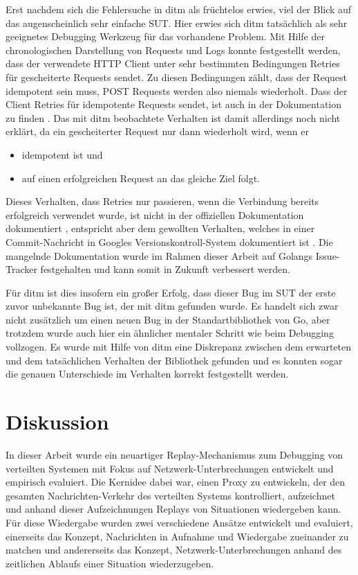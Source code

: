 \documentclass[12pt,a4paper]{report}
\begin{document}
Erst nachdem sich die Fehlersuche in ditm als früchtelos erwies, viel der Blick auf das augenscheinlich sehr einfache SUT.  Hier
erwies sich ditm tatsächlich als sehr geeignetes Debugging Werkzeug für das vorhandene Problem. Mit Hilfe der chronologischen
Darstellung von Requests und Logs konnte festgestellt werden, dass der verwendete HTTP Client unter sehr bestimmten Bedingungen
Retries für gescheiterte Requests sendet. Zu diesen Bedingungen zählt, dass der Request idempotent sein muss, POST Requests werden
also niemals wiederholt. Dass der Client Retries für idempotente Requests sendet, ist auch in der Dokumentation zu finden
\cite{go_transport_docs}. Das mit ditm beobachtete Verhalten ist damit allerdings noch nicht erklärt, da ein gescheiterter Request
nur dann wiederholt wird, wenn er
\begin{itemize}
    \item idempotent ist und
    \item auf einen erfolgreichen Request an das gleiche Ziel folgt.
\end{itemize}
Dieses Verhalten, dass Retries nur passieren, wenn die Verbindung bereits erfolgreich verwendet wurde,
ist nicht in der offiziellen Dokumentation dokumentiert \cite{go_transport_docs}, entspricht aber dem gewollten Verhalten, welches in
einer Commit-Nachricht in Googles Versionskontroll-System dokumentiert ist \cite{go_retry_commit}. Die mangelnde Dokumentation
wurde im Rahmen dieser Arbeit auf Golangs Issue-Tracker festgehalten und kann somit in Zukunft verbessert werden.

Für ditm ist dies insofern ein großer Erfolg, dass dieser Bug im SUT der erste zuvor unbekannte Bug ist, der mit ditm gefunden
wurde. Es handelt sich zwar nicht zusätzlich um einen neuen Bug in der Standartbibliothek von Go, aber trotzdem wurde auch hier
ein ähnlicher mentaler Schritt wie beim Debugging vollzogen. Es wurde mit Hilfe von ditm eine Diskrepanz zwischen dem erwarteten
und dem tatsächlichen Verhalten der Bibliothek gefunden und es konnten sogar die genauen Unterschiede im Verhalten korrekt
festgestellt werden.

\chapter{Diskussion}
\label{chap:discussion}
In dieser Arbeit wurde ein neuartiger Replay-Mechanismus zum Debugging von verteilten Systemen mit Fokus auf
Netzwerk-Unterbrechungen entwickelt und empirisch evaluiert. Die Kernidee dabei war, einen Proxy zu entwickeln, der den gesamten
Nachrichten-Verkehr des verteilten Systems kontrolliert, aufzeichnet und anhand dieser Aufzeichnungen Replays von Situationen
wiedergeben kann. Für diese Wiedergabe wurden zwei verschiedene Ansätze entwickelt und evaluiert, einerseits das Konzept, Nachrichten
in Aufnahme und Wiedergabe zueinander zu matchen und andererseits das Konzept, Netzwerk-Unterbrechungen anhand des zeitlichen
Ablaufs einer Situation wiederzugeben.
\end{document}
